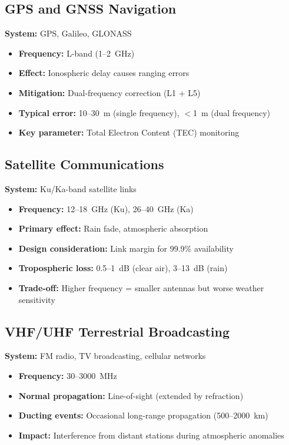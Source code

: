 \subsection{GPS and GNSS Navigation}

\textbf{System:} GPS, Galileo, GLONASS
\begin{itemize}
\item \textbf{Frequency:} L-band (1--2~GHz)
\item \textbf{Effect:} Ionospheric delay causes ranging errors
\item \textbf{Mitigation:} Dual-frequency correction (L1 + L5)
\item \textbf{Typical error:} 10--30~m (single frequency), $<$1~m (dual frequency)
\item \textbf{Key parameter:} Total Electron Content (TEC) monitoring
\end{itemize}

\subsection{Satellite Communications}

\textbf{System:} Ku/Ka-band satellite links
\begin{itemize}
\item \textbf{Frequency:} 12--18~GHz (Ku), 26--40~GHz (Ka)
\item \textbf{Primary effect:} Rain fade, atmospheric absorption
\item \textbf{Design consideration:} Link margin for 99.9\% availability
\item \textbf{Tropospheric loss:} 0.5--1~dB (clear air), 3--13~dB (rain)
\item \textbf{Trade-off:} Higher frequency = smaller antennas but worse weather sensitivity
\end{itemize}

\subsection{VHF/UHF Terrestrial Broadcasting}

\textbf{System:} FM radio, TV broadcasting, cellular networks
\begin{itemize}
\item \textbf{Frequency:} 30--3000~MHz
\item \textbf{Normal propagation:} Line-of-sight (extended by refraction)
\item \textbf{Ducting events:} Occasional long-range propagation (500--2000~km)
\item \textbf{Impact:} Interference from distant stations during atmospheric anomalies
\end{itemize}

